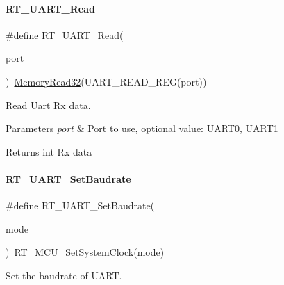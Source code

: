 \paragraph{\texorpdfstring{R\+T\+\_\+\+U\+A\+R\+T\+\_\+\+Read}{RT\_UART\_Read}}
{\footnotesize\ttfamily \#define R\+T\+\_\+\+U\+A\+R\+T\+\_\+\+Read(\begin{DoxyParamCaption}\item[{}]{port }\end{DoxyParamCaption})~\mbox{\hyperlink{a00020_a2d484dc15bdf30ee11ab3b05f31f0e16}{Memory\+Read32}}(U\+A\+R\+T\+\_\+\+R\+E\+A\+D\+\_\+\+R\+EG(port))}



Read Uart Rx data. 


\begin{DoxyParams}{Parameters}
{\em port} & Port to use, optional value\+: \mbox{\hyperlink{a00056_a0508661f121639ffdee7de2353a0def2}{U\+A\+R\+T0}}, \mbox{\hyperlink{a00056_a8d69bf04d07af4fbbab5a8bd291f65ff}{U\+A\+R\+T1}} \\
\hline
\end{DoxyParams}
\begin{DoxyReturn}{Returns}
int Rx data 
\end{DoxyReturn}
\mbox{\label{a00056_a565befb27caf782083358e0ad81af3a3}} 
\paragraph{\texorpdfstring{R\+T\+\_\+\+U\+A\+R\+T\+\_\+\+Set\+Baudrate}{RT\_UART\_SetBaudrate}}
{\footnotesize\ttfamily \#define R\+T\+\_\+\+U\+A\+R\+T\+\_\+\+Set\+Baudrate(\begin{DoxyParamCaption}\item[{}]{mode }\end{DoxyParamCaption})~\mbox{\hyperlink{a00020_a1e578ce669735935a1d505c0edf98221}{R\+T\+\_\+\+M\+C\+U\+\_\+\+Set\+System\+Clock}}(mode)}



Set the baudrate of U\+A\+RT. 


